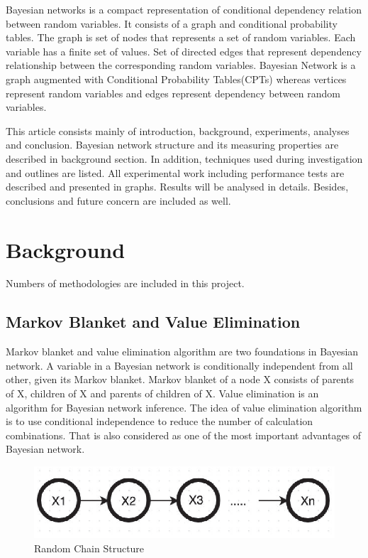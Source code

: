 \documentclass{article}
\begin{document}
Bayesian networks is a compact representation of conditional dependency relation between random variables. It consists of a graph and conditional probability tables. The graph is set of nodes that represents a set of random variables. Each variable has a finite set of values. Set of directed edges that represent dependency relationship between the corresponding random variables. Bayesian Network is a graph augmented with Conditional Probability Tables(CPTs) whereas vertices represent random variables and edges represent dependency between random variables.

This article consists mainly of introduction, background, experiments, analyses and conclusion. Bayesian network structure and its measuring properties are described in background section. In addition, techniques used during investigation and outlines are listed. All experimental work including performance tests are described and presented in graphs. Results will be analysed in details.  Besides, conclusions and future concern are included as well.

\section{Background}

Numbers of methodologies are included in this project.

\subsection{Markov Blanket and Value Elimination}
Markov blanket and value elimination algorithm are two foundations in Bayesian network. A variable in a Bayesian network is conditionally independent from all other, given its Markov blanket. Markov blanket of a node X consists of parents of X, children of X and parents of children of X\cite{value}. Value elimination is an algorithm for Bayesian network inference\cite{markov}. The idea of value elimination algorithm is to use conditional independence to reduce the number of calculation combinations. That is also considered as one of the most important advantages of Bayesian network. 

\begin{figure}[ht]
\vskip 0.2in
\begin{center}
\centerline{\includegraphics[width=\columnwidth]{rChain}}
\caption{Random Chain Structure}
\label{rChain}
\end{center}
\vskip -0.2in
\end{figure} 
\end{document}
